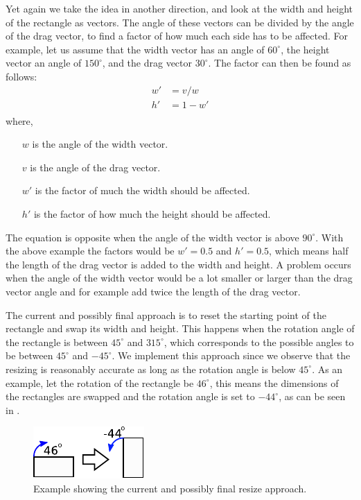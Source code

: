 Yet again we take the idea in another direction, and look at the width and height of the rectangle as vectors.
The angle of these vectors can be divided by the angle of the drag vector, to find a factor of how much each side has to be affected.
For example, let us assume that the width vector has an angle of $60^\circ$, the height vector an angle of $150^\circ$, and the drag vector $30^\circ$.
The factor can then be found as follows:
\begin{equation}
\begin{aligned}
w' &= v / w\\
h' &= 1 - w'\\
\end{aligned}
\end{equation}
where, 
\begin{itemize}
\item[$w$] is the angle of the width vector.
\item[$v$] is the angle of the drag vector.
\item[$w'$] is the factor of much the width should be affected.
\item[$h'$] is the factor of how much the height should be affected.
\end{itemize}
The equation is opposite when the angle of the width vector is above $90^\circ$.
With the above example the factors would be $w' = 0.5$ and $h' = 0.5$, which means half the length of the drag vector is added to the width and height.
A problem occurs when the angle of the width vector would be a lot smaller or larger than the drag vector angle and for example add twice the length of the drag vector.

The current and possibly final approach is to reset the starting point of the rectangle and swap its width and height.
This happens when the rotation angle of the rectangle is between $45^\circ$ and $315^\circ$, which corresponds to the possible angles to be between $45^\circ$ and $-45^\circ$.
We implement this approach since we observe that the resizing is reasonably accurate as long as the rotation angle is below $45^\circ$.
As an example, let the rotation of the rectangle be $46^\circ$, this means the dimensions of the rectangles are swapped and the rotation angle is set to $-44^\circ$, as can be seen in .
\begin{figure}
\centering
\includegraphics[scale=2]{media/sprint3/approach6}
\caption{Example showing the current and possibly final resize approach.}
\label{fig:app6}
\end{figure}
